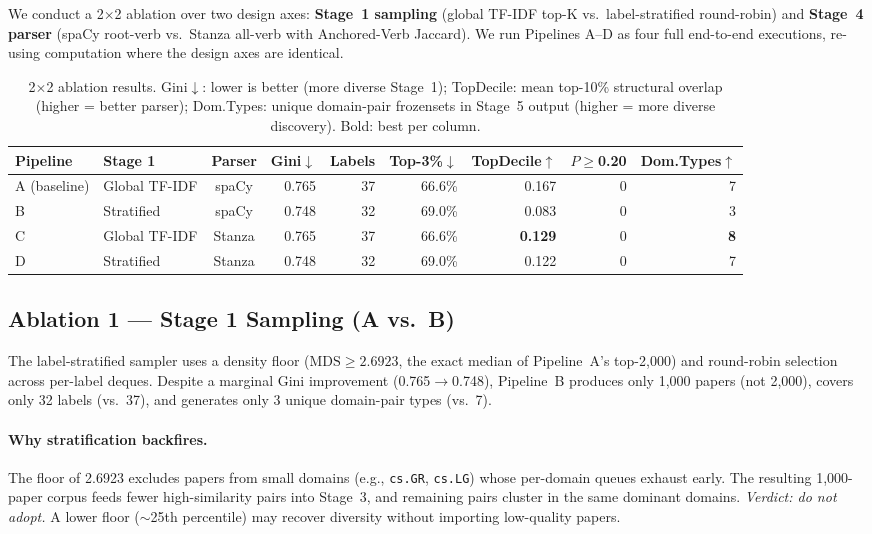 \documentclass[11pt]{article}
\begin{document}
We conduct a 2$\times$2 ablation over two design axes:
\textbf{Stage~1 sampling} (global TF-IDF top-K vs.\ label-stratified
round-robin) and \textbf{Stage~4 parser} (spaCy root-verb vs.\ Stanza
all-verb with Anchored-Verb Jaccard). We run Pipelines A--D as four
full end-to-end executions, re-using computation where the design axes
are identical.

\begin{table}[ht]
\small
\centering
\begin{tabular}{@{}llcrrrrrr@{}}
\toprule
\textbf{Pipeline} & \textbf{Stage 1} & \textbf{Parser} &
\textbf{Gini$\downarrow$} & \textbf{Labels} &
\textbf{Top-3\%$\downarrow$} & \textbf{TopDecile$\uparrow$} &
\textbf{$P\geq$0.20} & \textbf{Dom.Types$\uparrow$} \\
\midrule
A (baseline) & Global TF-IDF & spaCy  & 0.765 & 37 & 66.6\% & 0.167 & 0 & 7 \\
B            & Stratified    & spaCy  & 0.748 & 32 & 69.0\% & 0.083 & 0 & 3 \\
C            & Global TF-IDF & Stanza & 0.765 & 37 & 66.6\% & \textbf{0.129} & 0 & \textbf{8} \\
D            & Stratified    & Stanza & 0.748 & 32 & 69.0\% & 0.122 & 0 & 7 \\
\bottomrule
\end{tabular}
\caption{2$\times$2 ablation results. Gini$\downarrow$: lower is better (more
  diverse Stage~1); TopDecile: mean top-10\% structural overlap (higher =
  better parser); Dom.Types: unique domain-pair frozensets in Stage~5 output
  (higher = more diverse discovery). Bold: best per column.}
\label{tab:ablation}
\end{table}

\subsection{Ablation 1 --- Stage 1 Sampling (A vs.\ B)}

The label-stratified sampler uses a density floor
($\text{MDS} \geq 2.6923$, the exact median of Pipeline~A's top-2,000)
and round-robin selection across per-label deques. Despite a marginal
Gini improvement (0.765$\to$0.748), Pipeline~B produces only 1,000
papers (not 2,000), covers only 32 labels (vs.\ 37), and generates only
3 unique domain-pair types (vs.\ 7).

\paragraph{Why stratification backfires.}
The floor of 2.6923 excludes papers from small domains (e.g.,
\texttt{cs.GR}, \texttt{cs.LG}) whose per-domain queues exhaust early.
The resulting 1,000-paper corpus feeds fewer high-similarity pairs into
Stage~3, and remaining pairs cluster in the same dominant domains.
\textit{Verdict: do not adopt.} A lower floor ($\sim$25th percentile)
may recover diversity without importing low-quality papers.
\end{document}
